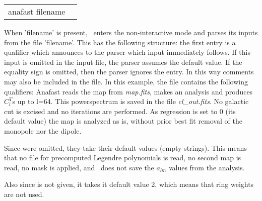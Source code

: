 \begin{examples}{2}
{
\begin{tabular}{ll} %
anafast  filename \\
\end{tabular}
}
{When 'filename' is present, \thedocid\ enters the non-interactive mode and parses
its inputs from the file 'filename'. This has the following
structure: the first entry is a qualifier which announces to the parser
which input immediately follows. If this input is omitted in the
input file, the parser assumes the default value.
If the equality sign is omitted, then the parser ignores the entry.
In this way comments may also be included in the file.
In this example, the file contains the following qualifiers:\hfill\newline
{}
Anafast reads the map from {\em map.fits}, makes an analysis and produces $C^T_l$s up to l=64.
This powerspectrum is saved in the file {\em cl\_out.fits}. 
No galactic cut is excised and no iterations are performed.
As regression is set to 0 (its default value) the map is analyzed as
is, without prior best fit removal of the monopole nor the dipole.

Since\hfill\newline
{}
were omitted, they take their default values (empty strings). 
This means that no file for precomputed
Legendre polynomials is read, no second map is read, no mask is applied, and \thedocid\ does not save the $a_{lm}$ values
from the analysis.

Also since\hfill\newline
{}
is not given, it takes it default value 2, which means that ring
weights are not used.

}
\end{examples}

